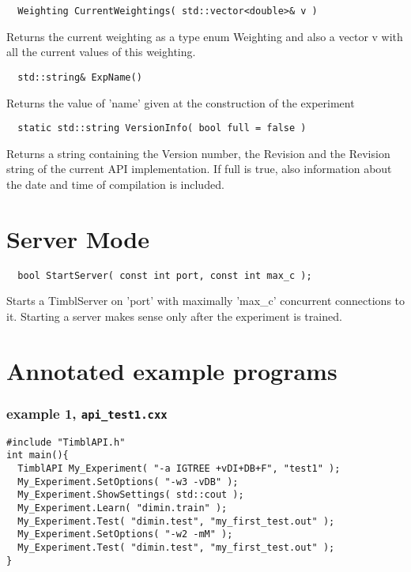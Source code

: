 \documentclass{report}
\begin{document}
\begin{footnotesize}
\begin{verbatim}
  Weighting CurrentWeightings( std::vector<double>& v )
\end{verbatim}
\end{footnotesize}

Returns the current weighting as a type enum Weighting and also a
vector v with all the current values of this weighting.

\begin{footnotesize}
\begin{verbatim}
  std::string& ExpName()
\end{verbatim}
\end{footnotesize}

Returns the value of 'name' given at the construction of the experiment

\begin{footnotesize}
\begin{verbatim}
  static std::string VersionInfo( bool full = false )
\end{verbatim}
\end{footnotesize}

Returns a string containing the Version number, the Revision and the
Revision string of the current API implementation. If full is true,
also information about the date and time of compilation is included.

\chapter{Server Mode}
\label{Using TiMBL as a Server}

\begin{footnotesize}
\begin{verbatim}
  bool StartServer( const int port, const int max_c );
\end{verbatim}
\end{footnotesize}

Starts a TimblServer on 'port' with maximally 'max\_c' concurrent
connections to it. Starting a server makes sense only after the
experiment is trained.

\clearpage
\chapter{Annotated example programs}

\subsection{example 1, {\tt api\_test1.cxx}}
\begin{footnotesize}
\begin{verbatim}	
#include "TimblAPI.h"
int main(){
  TimblAPI My_Experiment( "-a IGTREE +vDI+DB+F", "test1" );
  My_Experiment.SetOptions( "-w3 -vDB" );
  My_Experiment.ShowSettings( std::cout );
  My_Experiment.Learn( "dimin.train" );  
  My_Experiment.Test( "dimin.test", "my_first_test.out" );  
  My_Experiment.SetOptions( "-w2 -mM" );
  My_Experiment.Test( "dimin.test", "my_first_test.out" );  
}
\end{verbatim}
\end{footnotesize}
\end{document}
